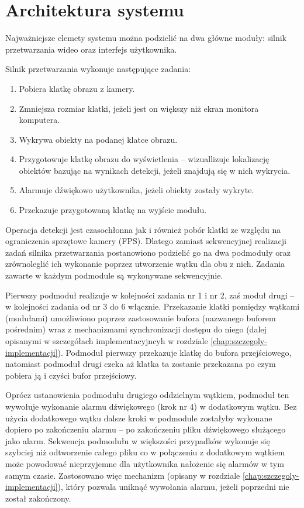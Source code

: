 \section{Architektura systemu}
\label{chap:architektura}
Najważniejsze elemety systemu można podzielić na dwa główne moduły: silnik przetwarzania wideo oraz interfejs użytkownika. 

Silnik przetwarzania wykonuje następujące zadania:
\begin{enumerate}
    \item Pobiera klatkę obrazu z kamery.
    \item Zmniejsza rozmiar klatki, jeżeli jest on większy niż ekran monitora komputera.
    \item Wykrywa obiekty na podanej klatce obrazu.
    \item Przygotowuje klatkę obrazu do wyświetlenia -- wizuallizuje lokalizację obiektów bazując na wynikach detekcji, jeżeli znajdują się w nich wykrycia.
    \item Alarmuje dźwiękowo użytkownika, jeżeli obiekty zostały wykryte.
    \item Przekazuje przygotowaną klatkę na wyjście modułu. 
\end{enumerate}

Operacja detekcji jest czasochłonna jak i również pobór klatki ze względu na ograniczenia sprzętowe kamery (FPS). Dlatego zamiast sekwencyjnej realizacji zadań silnika przetwarzania postanowiono podzielić go na dwa podmoduły oraz zrównoleglić ich wykonanie poprzez utworzenie wątku dla obu z nich. Zadania zawarte w każdym podmodule są wykonywane sekwencyjnie.

Pierwszy podmoduł realizuje w kolejności zadania nr 1 i nr 2, zaś moduł drugi -- w kolejności zadania od nr 3 do 6 włącznie. Przekazanie klatki pomiędzy wątkami (modułami) umożliwiono poprzez zastosowanie bufora (nazwanego buforem pośrednim) wraz z mechanizmami synchronizacji dostępu do niego (dalej opisanymi w szczegółach implementacyjncyh w rozdziale \ref{chap:szczegoly-implementacji}). Podmoduł pierwszy przekazuje klatkę do bufora przejściowego, natomiast podmoduł drugi czeka aż klatka ta zostanie przekazana po czym pobiera ją i czyści bufor przejściowy. 

Oprócz ustanowienia podmodułu drugiego oddzielnym wątkiem, podmoduł ten wywołuje wykonanie alarmu dźwiękowego (krok nr 4) w dodatkowym wątku. Bez użycia dodatkowego wątku dalsze kroki w podmodule zostałyby wykonane dopiero po zakończeniu alarmu -- po zakończeniu pliku dźwiękowego służącego jako alarm. Sekwencja podmodułu w większości przypadków wykonuje się szybciej niż odtworzenie całego pliku co w połączeniu z dodatkowym wątkiem może powodować nieprzyjemne dla użytkownika nałożenie się alarmów w tym samym czasie. Zastosowano więc mechanizm (opisany w rozdziale \ref{chap:szczegoly-implementacji}), który pozwala uniknąć wywołania alarmu, jeżeli poprzedni nie został zakończony.

